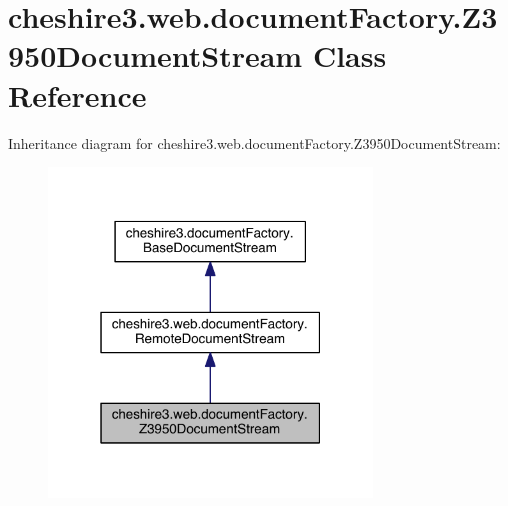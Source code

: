 \hypertarget{classcheshire3_1_1web_1_1document_factory_1_1_z3950_document_stream}{\section{cheshire3.\-web.\-document\-Factory.\-Z3950\-Document\-Stream Class Reference}
\label{classcheshire3_1_1web_1_1document_factory_1_1_z3950_document_stream}
}


Inheritance diagram for cheshire3.\-web.\-document\-Factory.\-Z3950\-Document\-Stream\-:
\nopagebreak
\begin{figure}[H]
\begin{center}
\leavevmode
\includegraphics[width=244pt]{classcheshire3_1_1web_1_1document_factory_1_1_z3950_document_stream__inherit__graph}
\end{center}
\end{figure}


